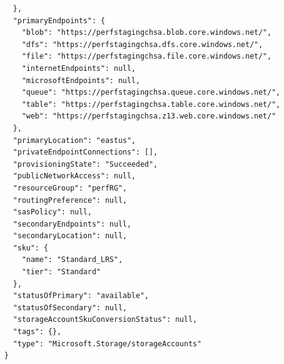 \begin{verbatim}
  },
  "primaryEndpoints": {
    "blob": "https://perfstagingchsa.blob.core.windows.net/",
    "dfs": "https://perfstagingchsa.dfs.core.windows.net/",
    "file": "https://perfstagingchsa.file.core.windows.net/",
    "internetEndpoints": null,
    "microsoftEndpoints": null,
    "queue": "https://perfstagingchsa.queue.core.windows.net/",
    "table": "https://perfstagingchsa.table.core.windows.net/",
    "web": "https://perfstagingchsa.z13.web.core.windows.net/"
  },
  "primaryLocation": "eastus",
  "privateEndpointConnections": [],
  "provisioningState": "Succeeded",
  "publicNetworkAccess": null,
  "resourceGroup": "perfRG",
  "routingPreference": null,
  "sasPolicy": null,
  "secondaryEndpoints": null,
  "secondaryLocation": null,
  "sku": {
    "name": "Standard_LRS",
    "tier": "Standard"
  },
  "statusOfPrimary": "available",
  "statusOfSecondary": null,
  "storageAccountSkuConversionStatus": null,
  "tags": {},
  "type": "Microsoft.Storage/storageAccounts"
}
\end{verbatim}
